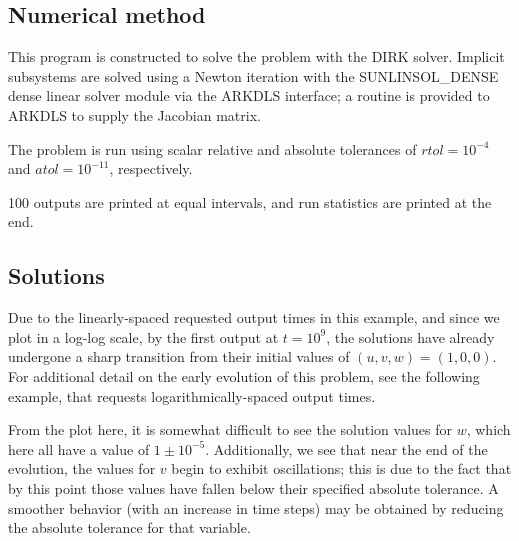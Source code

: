 \documentclass[letterpaper,10pt,english]{sphinxmanual}
\begin{document}
\subsection{Numerical method}
\label{c_serial:id11}
This program is constructed to solve the problem with the DIRK solver.
Implicit subsystems are solved using a Newton iteration with the
SUNLINSOL\_DENSE dense linear solver module via the ARKDLS interface; a
routine is provided to ARKDLS to supply the Jacobian matrix.

The problem is run using scalar relative and absolute tolerances of
\(rtol=10^{-4}\) and \(atol=10^{-11}\), respectively.

100 outputs are printed at equal intervals, and run statistics are
printed at the end.


\subsection{Solutions}
\label{c_serial:id12}
Due to the linearly-spaced requested output times in this example, and
since we plot in a log-log scale, by the first output at
\(t=10^9\), the solutions have already undergone a sharp
transition from their initial values of \((u,v,w) = (1, 0, 0)\).
For additional detail on the early evolution of this problem, see the
following example, that requests logarithmically-spaced output times.

From the plot here, it is somewhat difficult to see the solution
values for \(w\), which here all have a value of
\(1 \pm 10^{-5}\).  Additionally, we see that near the end of the
evolution, the values for \(v\) begin to exhibit oscillations;
this is due to the fact that by this point those values have fallen
below their specified absolute tolerance.  A smoother behavior (with
an increase in time steps) may be obtained by reducing the absolute
tolerance for that variable.
\begin{figure}[htbp]
\centering

\end{figure}
\end{document}
